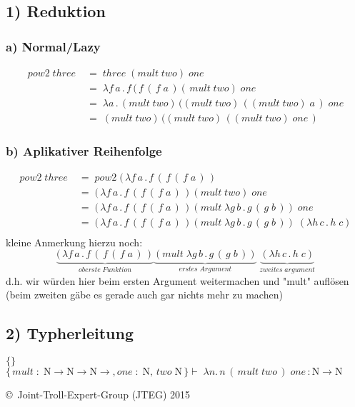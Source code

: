 \documentclass{article}
\begin{document}
	\subsection*{1) Reduktion}
	\subsubsection*{a) Normal/Lazy}
		\begin{align*}
			 pow2\;three\;	&=\;	three\;(mult\;two)\;one\\
			 				&=\;	\lambda f\,a\, .\,f\,(\,f\,(\,f\;a\,)(\,mult\;two)\;one\\
			 				&=\;	\lambda a\, .\, (mult\;two)\,((mult\;two)\,((mult\;two)\;a\,)\;one\\
			 				&=\;	(mult\;two)\,((mult\;two)\,((mult\;two)\;one\,)
		\end{align*}
	\subsubsection*{b) Aplikativer Reihenfolge}
		\begin{align*}
			pow2\;three\;	&=\;	pow2\; (\, \lambda f\,a\, .\,f\,(\,f\,(\,f\;a\,) \,)\\
							&=\;	(\, \lambda f\,a\, .\,f\,(\,f\,(\,f\;a\,) \,)(mult\;two)\;one\\
							&=\;	(\, \lambda f\,a\, .\,f\,(\,f\,(\,f\;a\,) \,)(mult\;\lambda g\,b\, .\,g\,(\,g\;b\,))\;one\\
							&=\;	(\, \lambda f\,a\, .\,f\,(\,f\,(\,f\;a\,) \,)(mult\;\lambda g\,b\, .\,g\,(\,g\;b\,))\;(\lambda h\,c\, .\,h\;c)\\
		\end{align*}
	kleine Anmerkung hierzu noch:
	\[
		\underbrace{(\, \lambda f\,a\, .\,f\,(\,f\,(\,f\;a\,) \,)}_{oberste\;Funktion}
		\underbrace{(mult\;\lambda g\,b\, .\,g\,(\,g\;b\,))}_{erstes\;Argument}
		\;
		\underbrace{(\lambda h\,c\, .\,h\;c)}_{zweites\;argument}
	\]
	d.h. wir w\"urden hier beim ersten Argument weitermachen und "mult" aufl\"osen
	(beim zweiten g\"abe es gerade auch gar nichts mehr zu machen)

	\subsection*{2) Typherleitung}
	
	
	$
	\{
		
	\}
	$
	\\
	$
	\{
		\,mult\;:\;
		\mathrm{N}\rightarrow\mathrm{N}\rightarrow\mathrm{N}\rightarrow ,
		one\; : \; \mathrm{N},\,two\;\mathrm{N}\,
	\}
	\vdash \; \lambda n.\,n\,(\, mult \; two\,)\;one\,:\mathrm{N}\rightarrow\mathrm{N}
	$	
		
		
		
		
		
		
		
		
		
		
		
	
\begin{tiny}
	\copyright\ Joint-Troll-Expert-Group (JTEG) 2015
\end{tiny}
\end{document}
